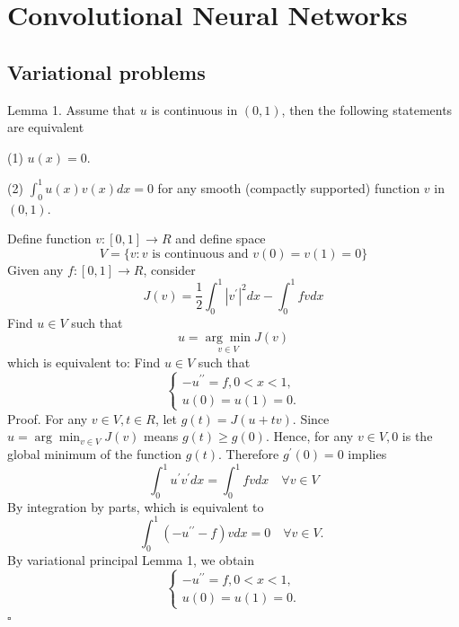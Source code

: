 \documentclass[10pt]{article}
\begin{document}
\section{Convolutional Neural Networks}
\subsection{Variational problems}
Lemma 1. Assume that $u$ is continuous in $(0,1)$, then the following statements are equivalent

(1) $u(x)=0$.

(2) $\int_{0}^{1} u(x) v(x) d x=0$ for any smooth (compactly supported) function $v$ in $(0,1)$.

Define function $v:[0,1] \rightarrow R$ and define space
$$
V=\{v: v \text { is continuous and } v(0)=v(1)=0\}
$$
Given any $f:[0,1] \rightarrow R$, consider
$$
J(v)=\frac{1}{2} \int_{0}^{1}\left|v^{\prime}\right|^{2} d x-\int_{0}^{1} f v d x
$$
Find $u \in V$ such that
$$
u=\underset{v \in V}{\arg \min } J(v)
$$
which is equivalent to: Find $u \in V$ such that
$$
\left\{\begin{array}{l}
-u^{\prime \prime}=f, 0<x<1, \\
u(0)=u(1)=0 .
\end{array}\right.
$$
Proof. For any $v \in V, t \in R$, let $g(t)=J(u+t v)$. Since $u=\arg \min _{v \in V} J(v)$ means $g(t) \geq g(0) .$ Hence, for any $v \in V, 0$ is the global minimum of the function $g(t)$. Therefore $g^{\prime}(0)=0$ implies
$$
\int_{0}^{1} u^{\prime} v^{\prime} d x=\int_{0}^{1} f v d x \quad \forall v \in V
$$
By integration by parts, which is equivalent to
$$
\int_{0}^{1}\left(-u^{\prime \prime}-f\right) v d x=0 \quad \forall v \in V \text {. }
$$
By variational principal Lemma 1, we obtain
$$
\left\{\begin{array}{l}
-u^{\prime \prime}=f, 0<x<1, \\
u(0)=u(1)=0 .
\end{array}\right.
$$
$\square$
\end{document}
